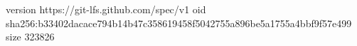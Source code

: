 version https://git-lfs.github.com/spec/v1
oid sha256:b33402dacace794b14b47c358619458f5042755a896be5a1755a4bbf9f57e499
size 323826
